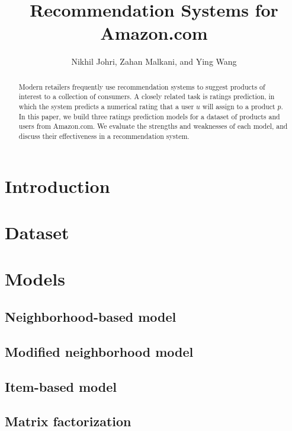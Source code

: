 \documentclass[letterpaper, 10 pt, conference]{ieeeconf}
\title{\LARGE \bf
Recommendation Systems for Amazon.com
}
\author{Nikhil Johri, Zahan Malkani, and Ying Wang
}
\begin{document}
\maketitle
\thispagestyle{empty}
\pagestyle{empty}


\begin{abstract}
Modern retailers frequently use recommendation systems to suggest products of 
interest to a collection of consumers. A closely related task is ratings 
prediction, in which the system predicts a numerical rating that a 
user $u$ will assign to a product $p$. In this paper, we build three ratings 
prediction models for a dataset of products and users from Amazon.com. We 
evaluate the strengths and weaknesses of each model, and discuss their 
effectiveness in a recommendation system.

\end{abstract}

\section{Introduction}

\section{Dataset}
\label{sec:dataset}

\section{Models}
\label{sec:models}

\subsection{Neighborhood-based model}
\subsection{Modified neighborhood model}
\subsection{Item-based model}
\subsection{Matrix factorization}
\end{document}
